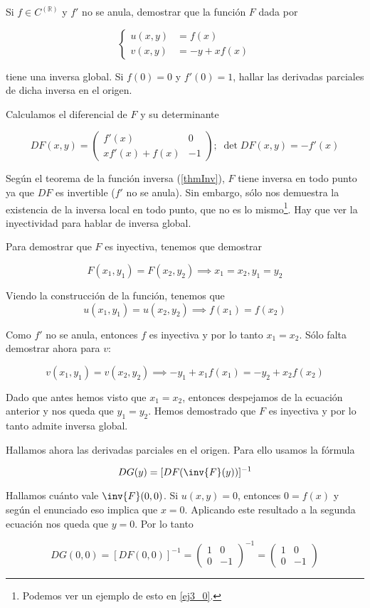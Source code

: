 \begin{problem}[5] Si $f∈C^(ℝ)$ y $f'$ no se anula, demostrar que la función $F$ dada por

\[ \begin{cases}
u(x,y) &= f(x) \\
v(x,y) &= -y + xf(x)
\end{cases} \]

tiene una inversa global. Si $f(0)=0$ y $f'(0)=1$, hallar las derivadas parciales de dicha inversa en el origen.
\solution

Calculamos el diferencial de $F$ y su determinante

\[ DF(x,y) = \begin{pmatrix}
f'(x) & 0 \\
xf'(x) + f(x) & -1
\end{pmatrix};\; \det DF(x,y) = -f'(x) \]

Según el teorema de la función inversa (\ref{thmInv}), $F$ tiene inversa en todo punto ya que $DF$ es invertible ($f'$ no se anula). Sin embargo, sólo nos demuestra la existencia de la inversa local en todo punto, que no es lo mismo\footnote{Podemos ver un ejemplo de esto en \ref{ej3_0}.}. Hay que ver la inyectividad para hablar de inversa global.

Para demostrar que $F$ es inyectiva, tenemos que demostrar

\[ F(x_1,y_1) = F(x_2,y_2) \implies x_1=x_2, y_1=y_2 \]

Viendo la construcción de la función, tenemos que
\[ u(x_1,y_1) = u(x_2,y_2) \implies f(x_1) = f(x_2) \]

Como $f'$ no se anula, entonces $f$ es inyectiva y por lo tanto $x_1=x_2$. Sólo falta demostrar ahora para $v$:

\[ v(x_1,y_1) = v(x_2,y_2) \implies  -y_1 + x_1f(x_1) = -y_2 + x_2f(x_2) \]

Dado que antes hemos visto que $x_1=x_2$, entonces despejamos de la ecuación anterior y nos queda que $y_1=y_2$. Hemos demostrado que $F$ es inyectiva y por lo tanto admite inversa global.

Hallamos ahora las derivadas parciales en el origen. Para ello usamos la fórmula

\[ DG(y) = [DF(\inv{F}(y))]^{-1} \]

Hallamos cuánto vale $\inv{F}(0,0)$. Si $u(x,y) = 0$, entonces $0 = f(x)$ y según el enunciado eso implica que $x=0$. Aplicando este resultado a la segunda ecuación nos queda que $y=0$. Por lo tanto

\[ DG(0,0) = [DF(0,0)]^{-1} = \begin{pmatrix}
1 & 0 \\
0 & -1
\end{pmatrix}^{-1} =
\begin{pmatrix}
1 & 0 \\
0 & -1
\end{pmatrix} \]

\end{problem}

